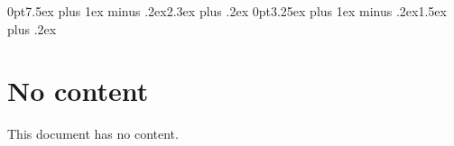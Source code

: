\documentclass[a4paper,11pt]{article}
\begin{document}
\title{\doctitle}
\author{\docauthor}
\date{\versiondate} 

\newcommand{\docsubtitle}{Requirement specification}
\newcommand{\docauthor}{Matthias Thomann}
\newcommand{\doctitle}{Procedural cloud shader}
\newcommand{\fieldofstudies}{BSc in Computer Science}
\newcommand{\specialisation}{Computer perception and virtual reality}
\newcommand{\prof}{Prof. Urs K\"unzler}

\newcommand{\versionnumber}{0.1}
\newcommand{\versiondate}{\today}

\titlespacing*{\section} {0pt}{7.5ex plus 1ex minus .2ex}{2.3ex plus .2ex}
\titlespacing*{\subsection} {0pt}{3.25ex plus 1ex minus .2ex}{1.5ex plus .2ex}



\tableofcontents
\clearpage

\section{No content}
This document has no content.

\clearpage

\printglossaries

\clearpage
\end{document}

